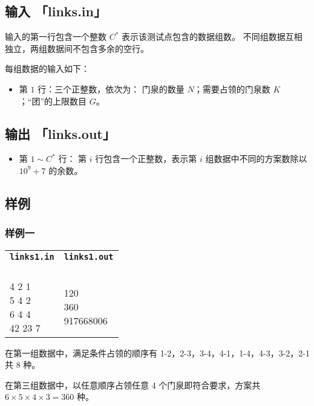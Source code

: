 \documentclass[UTF8, 11pt, a4paper]{article}
\begin{document}
\subsection*{输入 \makebox[0.5em]{} \small{「links.in」}}
输入的第一行包含一个整数 $C^*$ 表示该测试点包含的数据组数。%
不同组数据互相独立，两组数据间不包含多余的空行。

每组数据的输入如下：
\begin{itemize}
    \item 第 $1$ 行：三个正整数，依次为：
        门泉的数量 $N$；需要占领的门泉数 $K$；“团”的上限数目 $G$。
\end{itemize}

\subsection*{输出 \makebox[0.5em]{} \small{「links.out」}}
\begin{itemize}
    \item 第 $1 \sim C^*$ 行：%
        第 $i$ 行包含一个正整数，表示第 $i$ 组数据中不同的方案数除以 $10^9 + 7$ 的余数。
\end{itemize}
\newpage

\subsection*{样例}
\subsubsection*{样例一}
\begin{table}[h]\centering
\begin{tabularx}{0.8 \textwidth}{|X|X|}
\hline
\texttt{\textbf{links1.in}} & \texttt{\textbf{links1.out}} \\ \hline
{\ttfamily
4\newline
4 2 1\newline
5 4 2\newline
6 4 4\newline
42 23 7
} & {\ttfamily
8\newline
120\newline
360\newline
917668006
}
\\ \hline
\end{tabularx}\end{table}

在第一组数据中，满足条件占领的顺序有 1-2，2-3，3-4，4-1，1-4，4-3，3-2，2-1 共 8 种。

在第三组数据中，以任意顺序占领任意 4 个门泉即符合要求，方案共 $6 \times 5 \times 4 \times 3 = 360$ 种。
\end{document}
